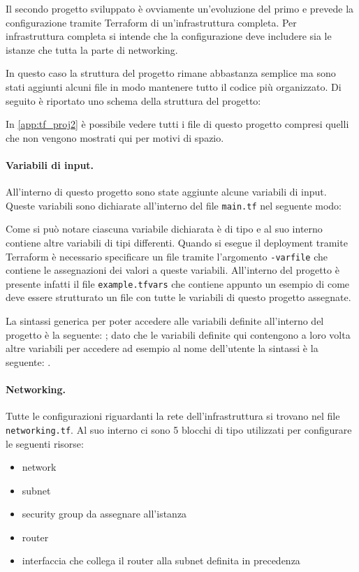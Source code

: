 Il secondo progetto sviluppato è ovviamente un'evoluzione del primo e prevede la configurazione tramite Terraform di un'infrastruttura completa. Per infrastruttura completa si intende che la configurazione deve includere sia le istanze che tutta la parte di networking.

In questo caso la struttura del progetto rimane abbastanza semplice ma sono stati aggiunti alcuni file in modo mantenere tutto il codice più organizzato. Di seguito è riportato uno schema della struttura del progetto:

In \cref{app:tf_proj2} è possibile vedere tutti i file di questo progetto compresi quelli che non vengono mostrati qui per motivi di spazio.

\paragraph{Variabili di input.} All'interno di questo progetto sono state aggiunte alcune variabili di input. Queste variabili sono dichiarate all'interno del file \verb|main.tf| nel seguente modo:

\noindent
Come si può notare ciascuna variabile dichiarata è di tipo  e al suo interno contiene altre variabili di tipi differenti. Quando si esegue il deployment tramite Terraform è necessario specificare un file tramite l'argomento \verb|-varfile| che contiene le assegnazioni dei valori a queste variabili. All'interno del progetto è presente infatti il file \verb|example.tfvars| che contiene appunto un esempio di come deve essere strutturato un file con tutte le variabili di questo progetto assegnate.

La sintassi generica per poter accedere alle variabili definite all'interno del progetto è la seguente: ; dato che le variabili definite qui contengono a loro volta altre variabili per accedere ad esempio al nome dell'utente la sintassi è la seguente: .

\paragraph{Networking.} Tutte le configurazioni riguardanti la rete dell'infrastruttura si trovano nel file \verb|networking.tf|. Al suo interno ci sono 5 blocchi di tipo  utilizzati per configurare le seguenti risorse:
\begin{itemize}
    \item network
    \item subnet
    \item security group da assegnare all'istanza
    \item router
    \item interfaccia che collega il router alla subnet definita in precedenza
\end{itemize}

